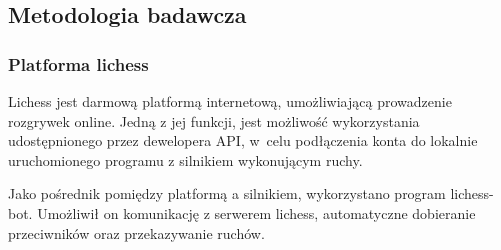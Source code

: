 \subsection{Metodologia badawcza}
\label{subsec:metodologia-badawcza}

\subsubsection{Platforma lichess}
Lichess jest darmową platformą internetową, umożliwiającą prowadzenie rozgrywek online.
Jedną z jej funkcji, jest możliwość wykorzystania udostępnionego przez dewelopera API, w~celu podłączenia konta do lokalnie uruchomionego programu z silnikiem wykonującym ruchy.

Jako pośrednik pomiędzy platformą a silnikiem, wykorzystano program lichess-bot.
Umożliwił on komunikację z serwerem lichess, automatyczne dobieranie przeciwników oraz przekazywanie ruchów.